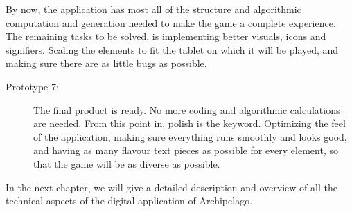 By now, the application has most all of the structure and algorithmic computation and generation needed to make the game a complete experience.
The remaining tasks to be solved, is implementing better visuals, icons and signifiers. Scaling the elements to fit the tablet on which it will be played, and making sure there are as little bugs as possible.

\begin{description}
\item[Prototype 7:]
The final product is ready. No more coding and algorithmic calculations are needed. From this point in, polish is the keyword. Optimizing the feel of the application, making sure everything runs smoothly and looks good, and having as many flavour text pieces as possible for every element, so that the game will be as diverse as possible.
\end{description}

In the next chapter, we will give a detailed description and overview of all the technical aspects of the digital application of Archipelago. 
